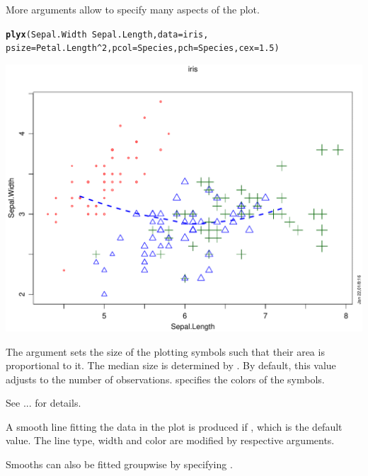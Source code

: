 \documentclass[11pt]{article}\usepackage[]{graphicx}\usepackage[]{color}
\makeatletter
\def\maxwidth{ %
  \ifdim\Gin@nat@width>\linewidth
    \linewidth
  \else
    \Gin@nat@width
  \fi
}
\newcommand{\hlnum}[1]{\textcolor[rgb]{0.686,0.059,0.569}{#1}}%
\newcommand{\hlopt}[1]{\textcolor[rgb]{0,0,0}{#1}}%
\newcommand{\hlstd}[1]{\textcolor[rgb]{0.345,0.345,0.345}{#1}}%
\newcommand{\hlkwc}[1]{\textcolor[rgb]{0.333,0.667,0.333}{#1}}%
\newcommand{\hlkwd}[1]{\textcolor[rgb]{0.737,0.353,0.396}{\textbf{#1}}}%
\newenvironment{kframe}{%
 \def\at@end@of@kframe{}%
 \ifinner\ifhmode%
  \def\at@end@of@kframe{\end{minipage}}%
  \begin{minipage}{\columnwidth}%
 \fi\fi%
 \def\FrameCommand##1{\hskip\@totalleftmargin \hskip-\fboxsep
 \colorbox{shadecolor}{##1}\hskip-\fboxsep
     \hskip-\linewidth \hskip-\@totalleftmargin \hskip\columnwidth}%
 \MakeFramed {\advance\hsize-\width
   \@totalleftmargin\z@ \linewidth\hsize
   \@setminipage}}%
 {\par\unskip\endMakeFramed%
 \at@end@of@kframe}
\newenvironment{knitrout}{}{} %
\makeatother
\begin{document}
More arguments allow to specify many aspects of the plot.
\begin{knitrout}
\color{fgcolor}\begin{kframe}
\begin{alltt}
\hlkwd{plyx}\hlstd{(Sepal.Width}\hlopt{~}\hlstd{Sepal.Length,} \hlkwc{data}\hlstd{=iris,}
     \hlkwc{psize}\hlstd{=Petal.Length}\hlopt{^}\hlnum{2}\hlstd{,} \hlkwc{pcol}\hlstd{=Species,} \hlkwc{pch}\hlstd{=Species,} \hlkwc{cex}\hlstd{=}\hlnum{1.5}\hlstd{)}
\end{alltt}
\end{kframe}
\includegraphics[width=\maxwidth]{figure/plyx_pchar-1} 

\end{knitrout}
The argument  sets the size of the plotting symbols
such that their area is proportional to it.
The median size is determined by .
By default, this value adjusts to the number of observations.
 specifies the colors of the symbols.

See ... for details.

A smooth line fitting the data in the plot is produced if 
, which is the default value. 
The line type, width and color are modified by respective arguments.

Smooths can also be fitted groupwise by specifying .
\end{document}
